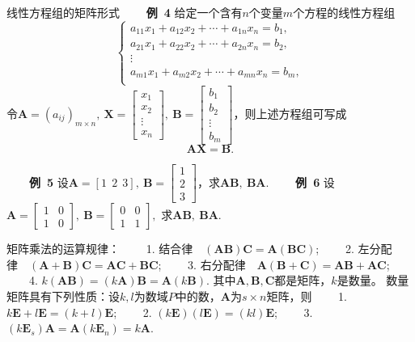 \documentclass[compress,mathserif,cjk]{beamer}
\theoremstyle{remark}
\numberwithin{equation}{section}
\newcommand{\hei}{\bf}      %
\begin{document}
\begin{CJK}{UTF8}{gbsn}
\begin{frame}{线性方程组的矩阵形式}
 \ \ \ \ {\hei 例~4} 给定一个含有$n$个变量$m$个方程的线性方程组
 \begin{equation*}
 \left\{\begin{array}{c}
 a_{11}x_1+a_{12}x_2+\cdots+a_{1n}x_n=b_1,\\
 a_{21}x_1+a_{22}x_2+\cdots+a_{2n}x_n=b_2,\\
 \vdots\\
 a_{m1}x_1+a_{m2}x_2+\cdots+a_{mn}x_n=b_m,\\
 \end{array}\right.
 \end{equation*}
 \pause 令$\bm A=(a_{ij})_{m\times n},~\bm X=\left[\begin{matrix}x_1\\x_2\\ \vdots\\x_n\end{matrix}\right],~\bm B=\left[\begin{matrix}b_1\\b_2\\ \vdots\\b_m\end{matrix}\right]$，则上述方程组可写成
 $$\bm A\bm X=\bm B.$$

\end{frame}

\begin{frame}
 \ \ \ \ {\hei 例~5} 设$\bm A=[1~~2~~3],~\bm B=\left[\begin{matrix}1\\2\\3\end{matrix}\right]$，求$\bm A\bm B,~\bm B\bm A.$
 \pause\vskip 10pt
 \ \ \ \ {\hei 例~6} 设$\bm A=\left[\begin{matrix}1&0\\1&0\end{matrix}\right],~\bm B=\left[\begin{matrix}0&0\\1&1\end{matrix}\right],$ 求$\bm A\bm B,~\bm B\bm A.$

\end{frame}

\begin{frame}
 矩阵乘法的运算规律：
 \vskip 5pt
 \ \ \ \ 1. 结合律\ \ $(\bm{AB})\bm C=\bm A(\bm{BC})$;
 \vskip 5pt
 \ \ \ \ 2. 左分配律\ \ $(\bm A+\bm B)\bm C=\bm{AC}+\bm{BC}$;
 \vskip 5pt
 \ \ \ \ 3. 右分配律\ \ $\bm A(\bm B+\bm C)=\bm{AB}+\bm{AC}$;
 \vskip 5pt
 \ \ \ \ 4. $k(\bm{AB})=(k\bm A)\bm B=\bm A(k\bm B)$.
 \vskip 5pt
 其中$\bm A,\bm B,\bm C$都是矩阵，$k$是数量。
  \pause\vskip 10pt
数量矩阵具有下列性质：设$k,l$为数域$P$中的数，$\bm A$为$s\times n$矩阵，则
 \vskip 5pt
 \ \ \ \ 1. $k\bm E+l\bm E=(k+l)\bm E$;
 \vskip 5pt
 \ \ \ \ 2. $(k\bm E)(l\bm E)=(kl)\bm E$;
 \vskip 5pt
 \ \ \ \ 3. $(k\bm E_s)\bm A=\bm A(k\bm E_n)=k\bm A$.


\end{frame}
\end{CJK}
\end{document}
